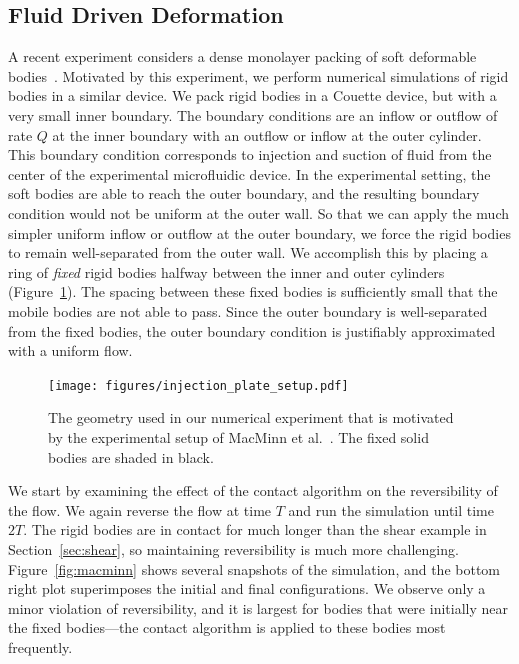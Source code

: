\documentclass[preprint, 10pt]{elsarticle}
\begin{document}
\subsection{Fluid Driven Deformation}
A recent experiment considers a dense monolayer packing of soft
deformable bodies~\cite{MacMinn2015}.  Motivated by this experiment, we
perform numerical simulations of rigid bodies in a similar device.  We
pack rigid bodies in a Couette device, but with a very small inner
boundary.  The boundary conditions are an inflow or outflow of rate $Q$
at the inner boundary with an outflow or inflow at the outer cylinder.
This boundary condition corresponds to injection and suction of fluid
from the center of the experimental microfluidic device.  In the
experimental setting, the soft bodies are able to reach the outer
boundary, and the resulting boundary condition would not be uniform at
the outer wall.  So that we can apply the much simpler uniform inflow or
outflow at the outer boundary, we force the rigid bodies to remain
well-separated from the outer wall.  We accomplish this by placing a
ring of {\em fixed} rigid bodies halfway between the inner and outer
cylinders (Figure~\ref{fig:radial}).  The spacing between these fixed
bodies is sufficiently small that the mobile bodies are not able to
pass.  Since the outer boundary is well-separated from the fixed bodies,
the outer boundary condition is justifiably approximated with a uniform
flow.

\begin{figure}[h!]
\begin{center}
\texttt{[image: figures/injection\_plate\_setup.pdf]}
\end{center}
\caption{\label{fig:radial} The geometry used in our numerical
experiment that is motivated by the experimental setup of MacMinn et
al.~\cite{MacMinn2015}.  The fixed solid bodies are shaded in black.}
\end{figure}

We start by examining the effect of the contact algorithm on the
reversibility of the flow.  We again reverse the flow at time $T$ and
run the simulation until time $2T$. The rigid bodies are in contact for
much longer than the shear example in Section~\ref{sec:shear}, so
maintaining reversibility is much more challenging.
Figure~\ref{fig:macminn} shows several snapshots of the simulation, and
the bottom right plot superimposes the initial and final configurations.
We observe only a minor violation of reversibility, and it is largest
for bodies that were initially near the fixed bodies---the contact
algorithm is applied to these bodies most frequently.
\end{document}
